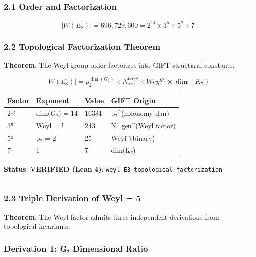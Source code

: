 \documentclass[11pt,a4paper]{article}
\begin{document}
{{{\subsubsection{2.1 Order and Factorization}\label{order-and-factorization}

\[|W(E_8)| = 696,729,600 = 2^{14} \times 3^5 \times 5^2 \times 7\]

\subsubsection{2.2 Topological Factorization Theorem}\label{topological-factorization-theorem}

\textbf{Theorem}: The Weyl group order factorizes into GIFT structural constants:

\[|W(E_8)| = p_2^{\dim(G_2)} \times N_{gen}^{Weyl} \times Weyl^{p_2} \times \dim(K_7)\]

{\def\LTcaptype{none} %
\begin{longtable}[]{@{}llll@{}}
\toprule\noalign{}
Factor & Exponent & Value & GIFT Origin \\
\midrule\noalign{}
\endhead
\bottomrule\noalign{}
\endlastfoot
2¹⁴ & dim(G₂) = 14 & 16384 & p₂\^{}(holonomy dim) \\
3⁵ & Weyl = 5 & 243 & N\_gen\^{}(Weyl factor) \\
5² & p₂ = 2 & 25 & Weyl\^{}(binary) \\
7¹ & 1 & 7 & dim(K₇) \\
\end{longtable}
\textbf{Status}: \textbf{VERIFIED (Lean 4)}: \texttt{weyl\_E8\_topological\_factorization}

\begin{center}\rule{0.5\linewidth}{0.5pt}\end{center}

\subsubsection{2.3 Triple Derivation of Weyl = 5}\label{triple-derivation-of-weyl-5}

\textbf{Theorem}: The Weyl factor admits three independent derivations from topological invariants.

\subsubsection{Derivation 1: G₂ Dimensional Ratio}\label{derivation-1-gux2082-dimensional-ratio}

}}}}
\end{document}
